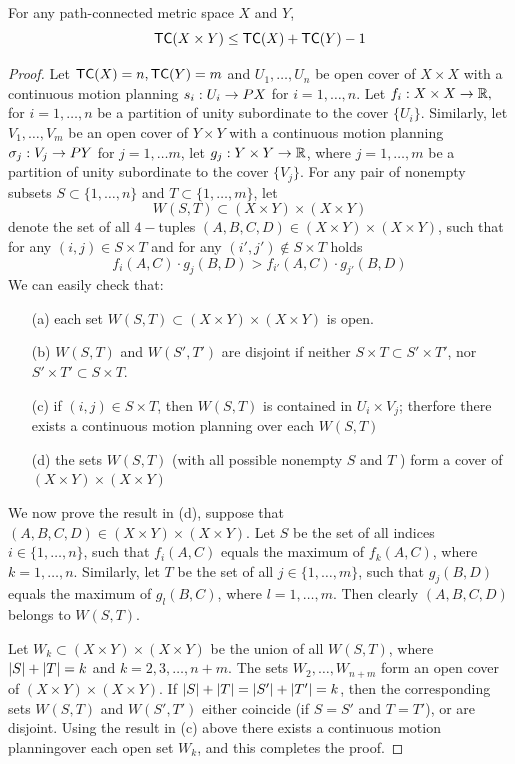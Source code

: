 \begin{thm}
    For any path-connected metric space $X$ and $Y$,
    \[
        \textsf{TC}(X \times Y) \le \textsf{TC}(X) + \textsf{TC}(Y) - 1
    \]
\end{thm}

\begin{proof}
    Let $\textsf{TC}(X) = n, \textsf{TC}(Y) = m$ and $U_1, \ldots, U_n$ be open cover of $X \times X$ with a continuous motion planning $s_i : U_i \rightarrow PX$ for $i = 1, \ldots, n$. 
    Let $f_i : X \times X \rightarrow \mathbb{R},$ for $i = 1, \ldots, n$ be a partition of unity subordinate to the cover $\{U_i\}$. 
    Similarly, let $V_1, \ldots,V_m$ be an open cover of $Y \times Y$ with a continuous motion planning $\sigma_j : V_j \rightarrow PY$ for $j = 1, \ldots m$, let $g_j : Y \times Y \rightarrow \mathbb{R}$, where $j = 1, \ldots, m$ be a partition of unity subordinate to the cover $\{V_j\}$. 
    For any pair of nonempty subsets $S \subset \{1, \ldots, n\}$ and $T \subset \{1, \ldots, m\}$, let
    \[
        W(S,T) \subset (X \times Y) \times (X \times Y)
    \]
    denote the set of all $4-$tuples $(A,B,C,D) \in (X \times Y) \times (X \times Y)$, such that for any $(i,j) \in S \times T$ and for any $(i', j') \notin S \times T$ holds
    \[
        f_i(A,C) \cdot g_j(B, D) > f_{i'}(A,C) \cdot g_{j'} (B, D)
    \]
    We can easily check that:
    \begin{itemize}
        \item[(a)] each set $W(S,T) \subset (X \times Y) \times (X \times Y)$ is open.
        \item[(b)] $W(S,T)$ and $W(S', T')$ are disjoint if neither $S \times T \subset S' \times T'$, nor $S' \times T' \subset S \times T$.
        \item[(c)] if $(i,j) \in S \times T$, then $W(S,T)$ is contained in $U_i \times V_j$; therfore there exists a continuous motion planning over each $W(S,T)$
        \item[(d)]  the sets $W(S,T)$ (with all possible nonempty $S$ and $T$ ) form a cover of $(X \times Y) \times (X \times Y)$
    \end{itemize}
    We now prove the result in (d), suppose that $(A,B,C,D) \in (X \times Y) \times (X \times Y)$. 
    Let $S$ be the set of all indices $i \in \{1, \ldots, n\}$, such that $f_i(A,C)$ equals the maximum of $f_k(A,C)$, where $k = 1, \ldots, n$. 
    Similarly, let $T$ be the set of all $j \in \{1, \ldots, m\}$, such that $g_j(B,D)$ equals the maximum of $g_l(B,C)$, where $l = 1, \ldots, m$. 
    Then clearly $(A,B,C,D)$ belongs to $W(S,T)$.

    Let $W_k \subset (X \times Y) \times (X \times Y)$ be the union of all $W(S,T)$, where $\lvert S\rvert + \lvert T\rvert = k$ and $k = 2,3, \ldots, n+m$. 
    The sets $W_2, \ldots, W_{n+m}$ form an open cover of $(X \times Y) \times (X \times Y)$. 
    If $\lvert S\rvert + \lvert T\rvert = \lvert S'\rvert + \lvert T'\rvert = k$, then the corresponding sets $W(S,T)$ and $W(S', T')$ either coincide (if $S = S'$ and $T = T'$), or are disjoint. 
    Using the result in (c) above there exists a continuous motion planningover each open set $W_k$, and this completes the proof.
\end{proof}

